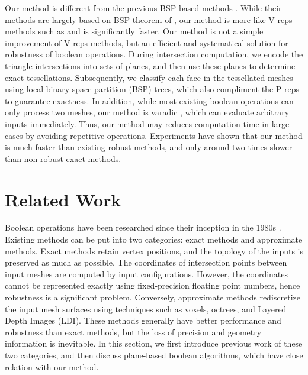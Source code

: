 Our method is different from the previous BSP-based methods \cite{bernstein2009fast,campen2010exact}.
While their methods are largely based on BSP theorem of \cite{naylor1990merging,thibault1987set}, our method is more like V-reps methods such as \cite{feito2013fast,zhou2016mesh} and is significantly faster. Our method is not a simple improvement of V-reps methods, but an efficient and systematical solution for robustness of boolean operations. During intersection computation, we encode the triangle intersections into sets of planes, and then use these planes to determine exact tessellations. Subsequently, we classify each face in the tessellated meshes using local binary space partition (BSP) trees, which also compliment the P-reps to guarantee exactness. In addition, while most existing boolean operations can only process two meshes, our method is varadic \cite{zhou2016mesh}, which can evaluate arbitrary inputs immediately. Thus, our method may reduces computation time in large cases by avoiding repetitive operations. Experiments have shown that our method is much faster than existing robust methods, and only around two times slower than non-robust exact methods.


\section{Related Work}


Boolean operations have been researched since their inception in the 1980s \cite{requicha1985boolean, laidlaw1986constructive}. Existing methods can be put into two categories: exact methods and approximate methods. Exact methods retain vertex positions, and the topology of the inputs is preserved as much as possible. The coordinates of intersection points between input meshes are computed by input configurations. However, the coordinates cannot be represented exactly using fixed-precision floating point numbers, hence robustness is a significant problem. Conversely, approximate methods rediscretize the input mesh surfaces using techniques such as voxels, octrees, and Layered Depth Images (LDI). These methods generally have better performance and robustness than exact methods, but the loss of precision and geometry information is inevitable. In this section, we first introduce previous work of these two categories, and then discuss plane-based boolean algorithms, which have close relation with our method.

